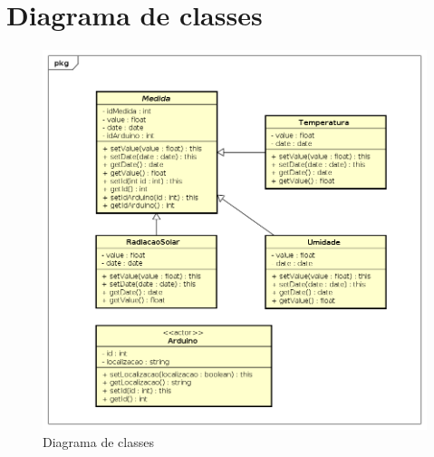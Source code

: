 \chapter{Diagrama de classes}

\begin{figure}[H]
    \label{figure_diagrama_classe}
    \centering
    \caption{Diagrama de classes}
    \label{includegraphics_diagrama_classe}
    \includegraphics[scale=0.6]{diagrams/classe.png}
    \hfill
\end{figure}
